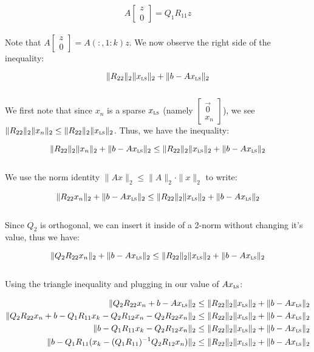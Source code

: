 \documentclass[12pt]{article}
\newcommand{\ls}{\textsc{ls}}
\begin{document}
$$A\begin{bmatrix}z \\ 0\end{bmatrix} = Q_1R_{11}z$$ \\

Note that $A\begin{bmatrix}z \\ 0\end{bmatrix} = A(:, 1:k)z$. We now observe the right side of the inequality:

$$\|R_{22}\|_2\|x_{\ls}\|_2 + \|b-Ax_{\ls}\|_2$$ \\

We first note that since $x_n$ is a sparse $x_{\ls}$ (namely $\begin{bmatrix}
        \vec{0} \\
        x_n
    \end{bmatrix}$), we see $\|R_{22}\|_2\|x_n\|_2 \leq \|R_{22}\|_2\|x_{\ls}\|_2$. Thus, we have the inequality:

$$\|R_{22}\|_2\|x_n\|_2 + \|b-Ax_{\ls}\|_2 \leq \|R_{22}\|_2\|x_{\ls}\|_2 + \|b-Ax_{\ls}\|_2$$ \\

We use the norm identity $\|Ax\|_2 \leq \|A\|_2 \cdot \|x\|_2$ to write:

$$\|R_{22}x_n\|_2 + \|b-Ax_{\ls}\|_2 \leq
    \|R_{22}\|_2\|x_{\ls}\|_2 + \|b-Ax_{\ls}\|_2$$ \\

Since $Q_2$ is orthogonal, we can insert it inside of a 2-norm without changing it's value, thus we have:

$$\|Q_2R_{22}x_n\|_2 + \|b-Ax_{\ls}\|_2 \leq
    \|R_{22}\|_2\|x_{\ls}\|_2 + \|b-Ax_{\ls}\|_2$$ \\

Using the triangle inequality and plugging in our value of $Ax_{\ls}$:

\begin{align*}
    \|Q_2R_{22}x_n + b-Ax_{\ls}\|_2                                     & \leq 
    \|R_{22}\|_2\|x_{\ls}\|_2 + \|b-Ax_{\ls}\|_2                                                                            \\
    \|Q_2R_{22}x_n + b - Q_1R_{11}x_k - Q_2R_{12}x_n - Q_2R_{22}x_n\|_2 & \leq 
    \|R_{22}\|_2\|x_{\ls}\|_2 + \|b-Ax_{\ls}\|_2                                                                            \\
    \| b - Q_1R_{11}x_k - Q_2R_{12}x_n\|_2                              & \leq \|R_{22}\|_2\|x_{\ls}\|_2 + \|b-Ax_{\ls}\|_2 \\
    \|b - Q_1R_{11}(x_k - (Q_1R_{11})^{-1}Q_2R_{12}x_n)\|_2             & \leq
    \|R_{22}\|_2\|x_{\ls}\|_2 + \|b-Ax_{\ls}\|_2
\end{align*}
\end{document}
